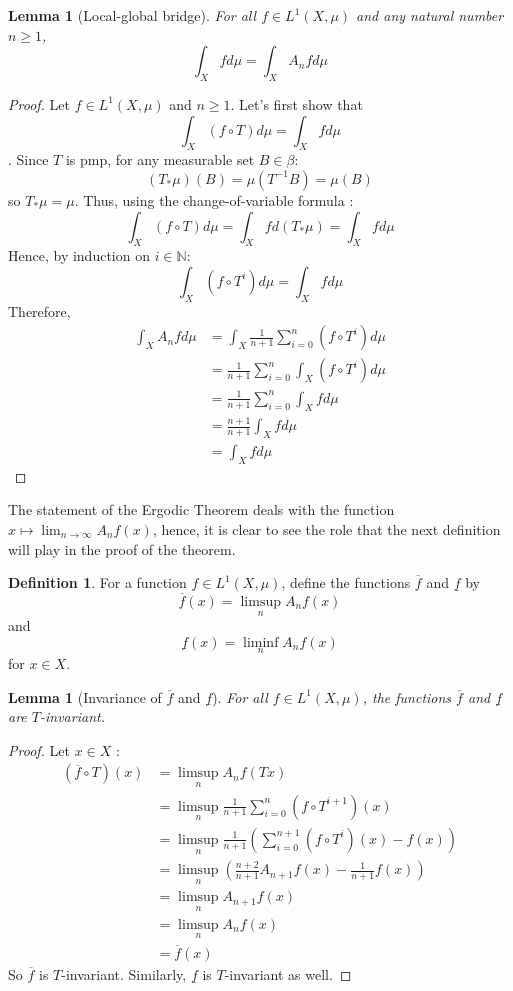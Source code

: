\documentclass{article}
\newtheorem{lemma}[theorem]{Lemma}
\theoremstyle{definition}
\newtheorem{definition}{Definition}[section]
\begin{document}
\begin{lemma}[Local-global bridge]
    For all $f\in L^1(X,\mu)$ and any natural number $n\geq 1$,
    $$\int_Xfd\mu = \int_XA_nfd\mu$$
\end{lemma}

\begin{proof}
    Let $f\in L^1(X,\mu)$ and $n\geq 1$. Let's first show that $$\int_X(f\circ T)d\mu = \int_Xfd\mu$$. Since $T$ is pmp, for any measurable set $B\in \beta$:
    $$(T_*\mu)(B)=\mu(T^{-1}B)=\mu(B)$$
    so $T_*\mu=\mu$. Thus, using the change-of-variable formula :
    $$ \int_X(f\circ T)d\mu = \int_Xfd(T_*\mu) = \int_Xfd\mu$$
    Hence, by induction on $i\in \mathbb{N}$:
    $$ \int_X(f\circ T^i)d\mu = \int_Xfd\mu$$
    Therefore,
    \begin{align*}
        \int_XA_nfd\mu &= \int_X \frac{1}{n+1}\sum_{i=0}^n(f\circ T^i) d\mu\\
        &= \frac{1}{n+1}\sum_{i=0}^n \int_X(f\circ T^i) d\mu\\
        &= \frac{1}{n+1}\sum_{i=0}^n \int_Xfd\mu\\
        &= \frac{n+1}{n+1}\int_Xfd\mu\\
        &= \int_Xfd\mu
    \end{align*}
    
\end{proof}

The statement of the Ergodic Theorem deals with the function $x\mapsto \lim_{n\to\infty}A_nf(x)$, hence, it is clear to see the role that the next definition will play in the proof of the theorem.

\begin{definition}
    For a function $f\in L^1(X,\mu)$, define the functions $\overline{f}$ and $\underline{f}$ by
    $$\overline{f}(x)=\limsup_nA_nf(x)$$
    and
    $$\underline{f}(x)=\liminf_nA_nf(x)$$
    for $x\in X$.
\end{definition}

\begin{lemma}[Invariance of $\overline{f}$ and $\underline{f}$]\label{Invariance}
    For all $f\in L^1(X,\mu)$, the functions $\overline{f}$ and $\underline{f}$ are $T$-invariant.
\end{lemma}

\begin{proof}
    Let $x\in X$ :
    \begin{align*}
        (\overline{f}\circ T)(x) &= \limsup_nA_nf(Tx) \\
        &= \limsup_n\frac{1}{n+1}\sum_{i=0}^n(f\circ T^{i+1})(x) \\
        &= \limsup_n\frac{1}{n+1} \left( \sum_{i=0}^{n+1}(f\circ T^i)(x) -f(x)\right) \\
        &= \limsup_n \left( \frac{n+2}{n+1}A_{n+1}f(x) -\frac{1}{n+1}f(x)\right) \\
        &= \limsup_nA_{n+1}f(x) \\
        &= \limsup_nA_nf(x) \\
        &= \overline{f}(x)
    \end{align*}
    So $\overline{f}$ is $T$-invariant. Similarly, $\underline{f}$ is $T$-invariant as well.
\end{proof}
\end{document}
